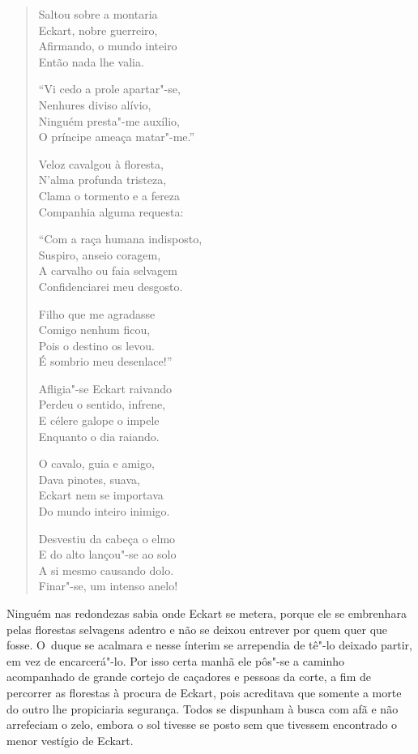 \begin{verse}
Saltou sobre a montaria\\
Eckart, nobre guerreiro,\\
Afirmando, o mundo inteiro\\
Então nada lhe valia.

``Vi cedo a prole apartar"-se,\\
Nenhures diviso alívio,\\
Ninguém presta"-me auxílio,\\
O príncipe ameaça matar"-me.''
 
Veloz cavalgou à floresta,\\
N'alma profunda tristeza,\\
Clama o tormento e a fereza\\
Companhia alguma requesta:

``Com a raça humana indisposto,\\
Suspiro, anseio coragem,\\
A carvalho ou faia selvagem\\
Confidenciarei meu desgosto.

Filho que me agradasse\\
Comigo nenhum ficou,\\
Pois o destino os levou.\\
É sombrio meu desenlace!''

Afligia"-se Eckart raivando\\
Perdeu o sentido, infrene,\\
E célere galope o impele\\
Enquanto o dia raiando.

O cavalo, guia e amigo,\\
Dava pinotes, suava,\\
Eckart nem se importava\\
Do mundo inteiro inimigo.

Desvestiu da cabeça o elmo\\
E do alto lançou"-se ao solo\\
A si mesmo causando dolo.\\
Finar"-se, um intenso anelo!
\end{verse}


 Ninguém nas redondezas sabia onde Eckart se metera, porque ele
se embrenhara pelas florestas selvagens adentro e não se deixou
entrever por quem quer que fosse. \mbox{O duque} se acalmara e nesse ínterim
se arrependia de tê"-lo deixado partir, em vez de encarcerá"-lo. Por
isso certa manhã ele pôs"-se a caminho acompanhado de grande cortejo de
caçadores e pessoas da corte, a fim de percorrer as florestas à procura
de Eckart, pois acreditava que somente a morte do outro lhe propiciaria
segurança. Todos se dispunham à busca com afã e não arrefeciam o zelo,
embora o sol tivesse se posto sem que tivessem encontrado o menor
vestígio de Eckart.

